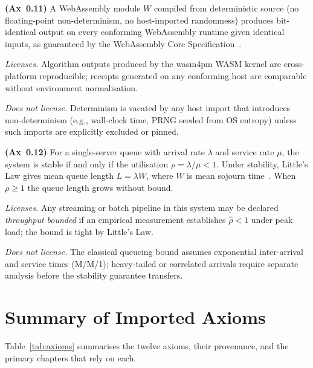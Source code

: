 \begin{axiom}\label{ax:wasm}
\textbf{(Ax~0.11)}
A WebAssembly module $W$ compiled from deterministic source (no floating-point
non-determinism, no host-imported randomness) produces bit-identical output
on every conforming WebAssembly runtime given identical inputs, as guaranteed
by the WebAssembly Core Specification~\cite{webassembly2019}.
\end{axiom}

\noindent\textit{Licenses.}
Algorithm outputs produced by the wasm4pm WASM kernel are cross-platform
reproducible; receipts generated on any conforming host are comparable without
environment normalisation.

\noindent\textit{Does not license.}
Determinism is vacated by any host import that introduces non-determinism
(e.g., wall-clock time, PRNG seeded from OS entropy) unless such imports are
explicitly excluded or pinned.

\begin{axiom}\label{ax:queueing}
\textbf{(Ax~0.12)}
For a single-server queue with arrival rate $\lambda$ and service rate $\mu$,
the system is stable if and only if the utilisation $\rho = \lambda / \mu < 1$.
Under stability, Little's Law gives mean queue length $L = \lambda W$, where
$W$ is mean sojourn time~\cite{feller1968}.
When $\rho \geq 1$ the queue length grows without bound.
\end{axiom}

\noindent\textit{Licenses.}
Any streaming or batch pipeline in this system may be declared \emph{throughput
bounded} if an empirical measurement establishes $\hat{\rho} < 1$ under peak
load; the bound is tight by Little's Law.

\noindent\textit{Does not license.}
The classical queueing bound assumes exponential inter-arrival and service
times (M/M/1); heavy-tailed or correlated arrivals require separate analysis
before the stability guarantee transfers.

\section*{Summary of Imported Axioms}

Table~\ref{tab:axioms} summarises the twelve axioms, their provenance, and
the primary chapters that rely on each.

